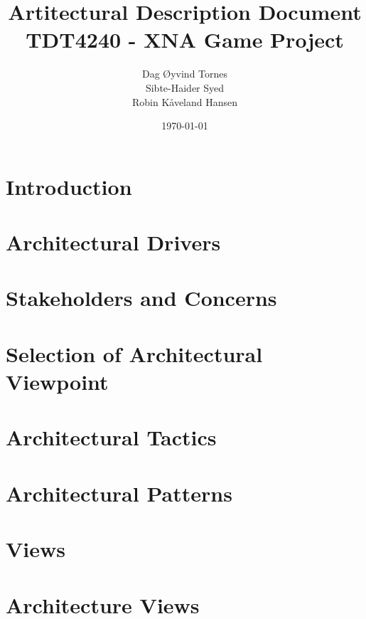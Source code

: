 \documentclass[titlepage,a4paper,11pt]{article}
\date{\today}
\begin{document}
\title{Artitectural Description Document\\
 		TDT4240 - XNA Game Project}

\author{Dag Øyvind Tornes\\
 		Sibte-Haider Syed\\ 
		Robin Kåveland Hansen\\}
\maketitle

\pagestyle{empty}
\tableofcontents
\clearpage
\pagestyle{plain}

\section{Introduction}


\section{Architectural Drivers}


\section{Stakeholders and Concerns}


\section{Selection of Architectural Viewpoint}


\section{Architectural Tactics}


\section{Architectural Patterns}


\section{Views}


\section{Architecture Views}

\end{document}
